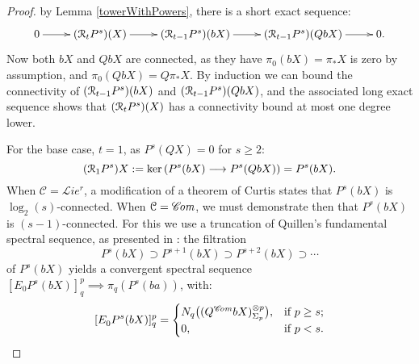 \documentclass[11pt]{amsart} \renewcommand{\baselinestretch}{1.2}
\theoremstyle{plain}
\numberwithin{equation}{section} %
\theoremstyle{plain}
\numberwithin{equation}{chapter} %
\renewcommand{\ker}{\mathrm{ker}\,}
\renewcommand{\to}{\longrightarrow}
\newcommand{\scrL}{\mathscr{L}}
\newcommand{\scrC}{\mathscr{C}}
\newcommand{\calR}{\mathcal{R}}
\newcommand{\calc}{\mathcal{C}}
\newcommand{\citeBOX}[2][]{\cite[\mbox{#1}]{#2}}
\newcommand{\algs}{{\scrC\!\textit{\normalfont\textit{om}}}}
\newcommand{\restliealgs}{{\scrL\!\textit{ie}^\textit{r}}}
\newcommand{\algcat}{{\calc}}%
\newcommand{\E}[5]{[E^{#1}_{#2}#3]^{#4}_{#5}}
\newcommand{\caldup}[1]{\calR_{\smash{#1}}}
\newcommand{\barConstructionMightAbbreviate}{b}
\begin{document}
\begin{Bousfield-Kan spectral sequence}
\begin{proof}
by Lemma \ref{towerWithPowers}, there is a short exact sequence:
\[\xymatrix{
0\ar[r]&
(\caldup{t}P^{s})(X)\ar[r]&
(\caldup{t-1}P^{s})(\barConstructionMightAbbreviate X)\ar[r]&
(\caldup{t-1}P^{s})(Q\barConstructionMightAbbreviate X)\ar[r]&
0.
}\]
Now both $\barConstructionMightAbbreviate X$ and $Q\barConstructionMightAbbreviate X$ are connected, as they have $\pi_0(\barConstructionMightAbbreviate X)=\pi_*X$ is zero by assumption, and $\pi_0(Q\barConstructionMightAbbreviate X)=Q\pi_*X$. By induction we can bound the connectivity of $(\caldup{t-1}P^{s})(\barConstructionMightAbbreviate X)$ and $(\caldup{t-1}P^{s})(Q\barConstructionMightAbbreviate X)$, and the associated long exact sequence shows that $(\caldup{t}P^{s})(X)$ has a connectivity bound at most one degree lower.


For the base case, $t=1$, as $P^s(QX)=0$ for $s\geq2$:
\[(\caldup{1}P^{s})X:=\ker(P^{s}(\barConstructionMightAbbreviate X)\to P^{s}(Q\barConstructionMightAbbreviate X))=P^{s}(\barConstructionMightAbbreviate X).\]
When $\algcat=\restliealgs$, a modification \citeBOX[4.3]{6Author.pdf} of a theorem of Curtis \citeBOX[\S5]{Curtis_LCS.pdf} states that $P^{s}(\barConstructionMightAbbreviate X)$ is $\log_2(s)$-connected.
When $\algcat=\algs$, we must demonstrate then that $P^s(\barConstructionMightAbbreviate X)$ is $(s-1)$-connected. For this
 we use a truncation of Quillen's fundamental spectral sequence, as presented in \cite[Theorem 6.2]{MR1089001}: the filtration
\[P^s(\barConstructionMightAbbreviate X)\supset P^{s+1}(\barConstructionMightAbbreviate X)\supset P^{s+2}(\barConstructionMightAbbreviate X)\supset\cdots \]
of $P^s(\barConstructionMightAbbreviate X)$ yields a convergent spectral sequence  $\E{}{0}{P^s(\barConstructionMightAbbreviate X)}{p}{q}\implies \pi_q(P^s(\barConstructionMightAbbreviate a))$, with:
\[\E{}{0}{P^s(\barConstructionMightAbbreviate X)}{p}{q}=
\begin{cases}
N_q\bigl((Q^{\algs}\barConstructionMightAbbreviate X)^{\otimes p}_{\Sigma_p}\bigr),&\textup{if }p\geq s;\\
0,&\textup{if }p<s.
\end{cases}\]

\end{proof}
\end{Bousfield-Kan spectral sequence}
\end{document}
